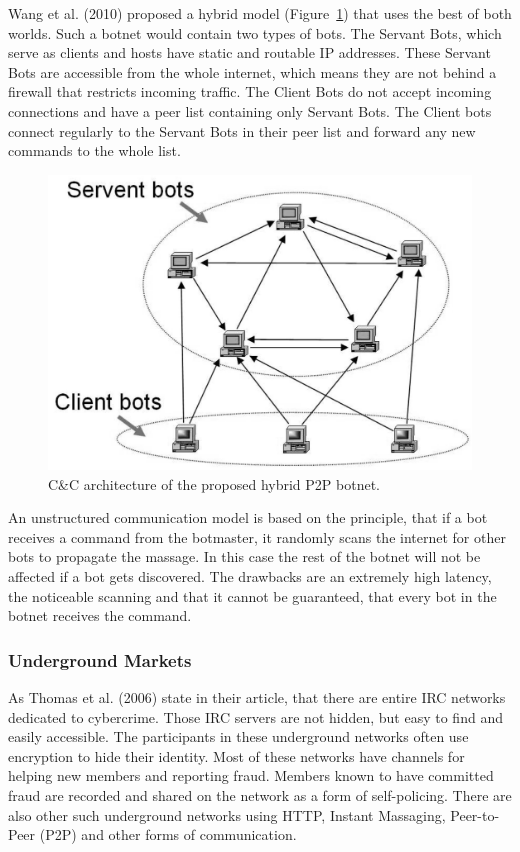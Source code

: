 Wang et al. (2010) proposed a hybrid model (Figure~\ref{fig:hybrid}) that uses the best of both worlds.
Such a botnet would contain two types of bots.
The Servant Bots, which serve as clients and hosts have static and routable IP addresses.
These Servant Bots are accessible from the whole internet, which means they are not behind a firewall that restricts incoming traffic.
The Client Bots do not accept incoming connections and have a peer list containing only Servant Bots.
The Client bots connect regularly to the Servant Bots in their peer list and forward any new commands to the whole list.\cite{Wang10}

\begin{figure}[ht]
\begin{center} \includegraphics[scale=0.3]{Talk11/CC-hybrid} \end{center}
\caption{C\&C architecture of the proposed hybrid P2P botnet.\cite{Wang10}}
\label{fig:hybrid}
\end{figure}

An unstructured communication model is based on the principle, that if a bot receives a command from the botmaster, it randomly scans the internet for other bots to propagate the massage.
In this case the rest of the botnet will not be affected if a bot gets discovered.
The drawbacks are an extremely high latency, the noticeable scanning and that it cannot be guaranteed, that every bot in the botnet receives the command.\cite{Cooke05}

\subsubsection{Underground Markets}
As Thomas et al. (2006) state in their article, that there are entire IRC networks dedicated to cybercrime.
Those IRC servers are not hidden, but easy to find and easily accessible.
The participants in these underground networks often use encryption to hide their identity.
Most of these networks have channels for helping new members and reporting fraud.
Members known to have committed fraud are recorded and shared on the network as a form of self-policing.
There are also other such underground networks using HTTP, Instant Massaging, Peer-to-Peer (P2P) and other forms of communication.\cite{Thomas06}

